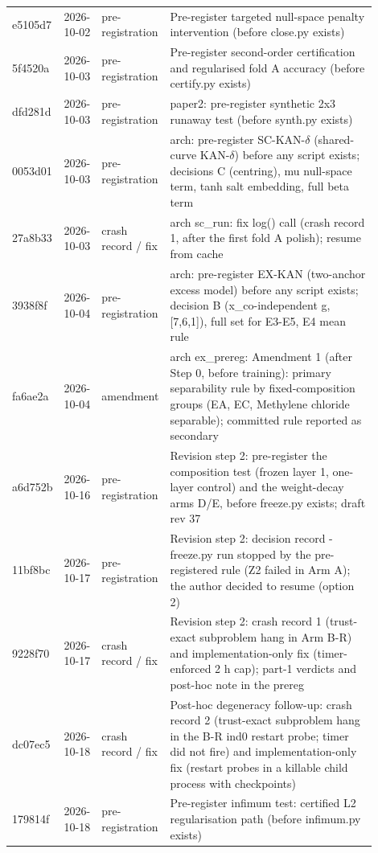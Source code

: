 {\begin{longtable}{R{0.08\linewidth} R{0.10\linewidth} R{0.14\linewidth} R{0.58\linewidth}}
e5105d7 & 2026-10-02 & pre-registration & Pre-register targeted null-space penalty intervention (before close.py exists) \\
5f4520a & 2026-10-03 & pre-registration & Pre-register second-order certification and regularised fold A accuracy (before certify.py exists) \\
dfd281d & 2026-10-03 & pre-registration & paper2: pre-register synthetic 2x3 runaway test (before synth.py exists) \\
0053d01 & 2026-10-03 & pre-registration & arch: pre-register SC-KAN-$\delta$ (shared-curve KAN-$\delta$) before any script exists; decisions C (centring), mu null-space term, tanh salt embedding, full beta term \\
27a8b33 & 2026-10-03 & crash record / fix & arch sc\_run: fix log() call (crash record 1, after the first fold A polish); resume from cache \\
3938f8f & 2026-10-04 & pre-registration & arch: pre-register EX-KAN (two-anchor excess model) before any script exists; decision B (x\_co-independent g, [7,6,1]), full set for E3-E5, E4 mean rule \\
fa6ae2a & 2026-10-04 & amendment & arch ex\_prereg: Amendment 1 (after Step 0, before training): primary separability rule by fixed-composition groups (EA, EC, Methylene chloride separable); committed rule reported as secondary \\
a6d752b & 2026-10-16 & pre-registration & Revision step 2: pre-register the composition test (frozen layer 1, one-layer control) and the weight-decay arms D/E, before freeze.py exists; draft rev 37 \\
11bf8bc & 2026-10-17 & pre-registration & Revision step 2: decision record - freeze.py run stopped by the pre-registered rule (Z2 failed in Arm A); the author decided to resume (option 2) \\
9228f70 & 2026-10-17 & crash record / fix & Revision step 2: crash record 1 (trust-exact subproblem hang in Arm B-R) and implementation-only fix (timer-enforced 2 h cap); part-1 verdicts and post-hoc note in the prereg \\
dc07ec5 & 2026-10-18 & crash record / fix & Post-hoc degeneracy follow-up: crash record 2 (trust-exact subproblem hang in the B-R ind0 restart probe; timer did not fire) and implementation-only fix (restart probes in a killable child process with checkpoints) \\
179814f & 2026-10-18 & pre-registration & Pre-register infimum test: certified L2 regularisation path (before infimum.py exists) \\

\end{longtable}}
